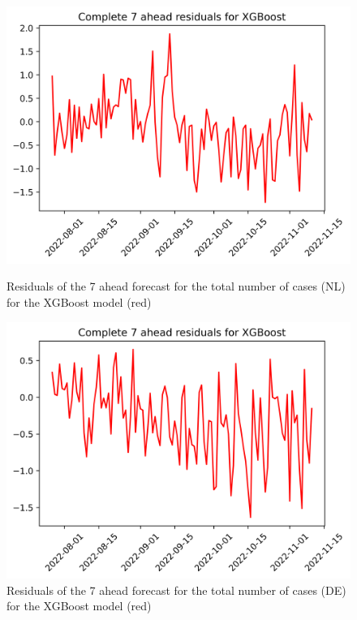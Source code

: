 \begin{figure}

\begin{minipage}{.45\textwidth}
  \centering
  \includegraphics[width=\linewidth]{pics/7_ah/7_ahead_errors_XGBoost.png}
  \caption{Residuals of the 7 ahead forecast for the total number of cases (NL) for the XGBoost model (red)}
  \label{fig:tot_cases_error_7_xgb}
\end{minipage}
\begin{minipage}{.45\textwidth}
  \centering
  \includegraphics[width=\linewidth]{pics/7_ah/DE_7_ahead_errors_XGBoost.png}
  \caption{Residuals of the 7 ahead forecast for the total number of cases (DE) for the XGBoost model (red)}
  \label{fig:tot_cases_error_7_xgb_DE}
\end{minipage}

\end{figure}
